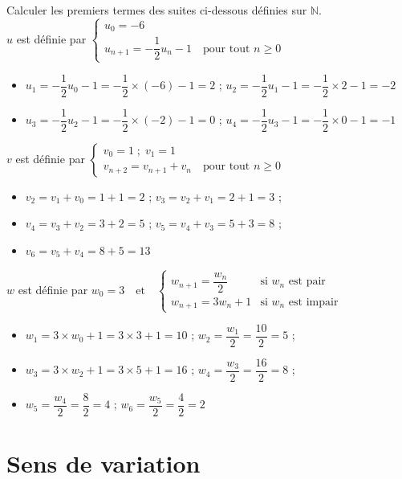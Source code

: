 \documentclass[french]{book}
\newcommand{\N}{\mathbb {N}}
\newcommand{\se}{\geq}
\begin{document}
\begin{exemple}
Calculer les premiers termes des suites ci-dessous définies sur $\N$.\\

$u$ est définie par
$
\left\{\begin{array}{l}
u_0=-6\\
u_{n+1}=-\dfrac{1}{2}u_{n}-1 \quad \text{pour tout }n\se0
\end{array}
\right.
$

\begin{itemize}
\item $u_1=-\dfrac{1}{2}u_0-1=-\dfrac{1}{2}\times(-6)-1=2$ ; $u_2=-\dfrac{1}{2}u_1-1=-\dfrac{1}{2}\times2-1=-2$
\item $u_3=-\dfrac{1}{2}u_2-1=-\dfrac{1}{2}\times(-2)-1=0$ ; $u_4=-\dfrac{1}{2}u_3-1=-\dfrac{1}{2}\times0-1=-1$
\end{itemize}

$v$ est définie par
$
\left\{\begin{array}{l}
v_0=1\; ; \; v_1=1\\
v_{n+2}=v_{n+1}+v_{n} \quad \text{pour tout }n\se0
\end{array}
\right.
$

\begin{itemize}
\item $v_2=v_1+v_0=1+1=2$ ; $v_3=v_2+v_1=2+1=3$ ;
\item $v_4=v_3+v_2=3+2=5$ ; $v_5=v_4+v_3=5+3=8$ ;
\item  $v_6=v_5+v_4=8+5=13$
\end{itemize}

$w$ est définie par
$w_0=3
\quad
\text{et}
\quad
\begin{cases}
w_{n+1}=\dfrac{w_{n}}{2}&\text{si $w_n$ est pair}\\
w_{n+1}=3w_{n}+1&\text{si $w_n$ est impair}
\end{cases}
$


\begin{itemize}
\item $w_1=3\times w_0 + 1 = 3\times3 +1 = 10$ ; $w_2=\dfrac{w_1}{2}=\dfrac{10}{2}=5$ ; \item $w_3=3\times w_2 + 1 = 3\times5 +1 = 16$ ; $w_4=\dfrac{w_3}{2}=\dfrac{16}{2}=8$ ; \item $w_5=\dfrac{w_4}{2}=\dfrac{8}{2}=4$ ; $w_6=\dfrac{w_5}{2}=\dfrac{4}{2}=2$
\end{itemize}
\end{exemple}
\newpage
\section{Sens de variation}
\end{document}
